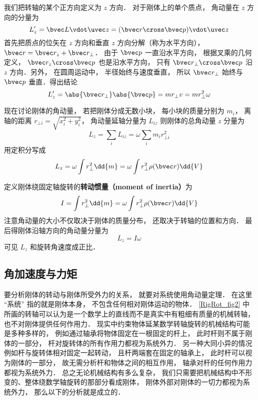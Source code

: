 我们把转轴的某个正方向定义为 $z$ 方向． 对于刚体上的单个质点， 角动量在 $z$ 方向的分量为
\begin{equation}
L'_{z} = \bvec L \vdot \uvec z = (\bvec r \cross \bvec p) \vdot \uvec z
\end{equation}
首先把质点的位矢在 $z$ 方向和垂直 $z$ 方向分解（称为水平方向）， $\bvec r = \bvec r_z + \bvec r_ \bot$． 由于 $\bvec p$ 一直沿水平方向， 根据叉乘的几何定义， $\bvec r_z \cross \bvec p$ 也是沿水平方向， 只有 $\bvec r_ \bot \cross \bvec p$ 沿 $z$ 方向．另外， 在圆周运动中， 半径始终与速度垂直， 所以 $\bvec r_ \bot$ 始终与 $\bvec p$ 垂直．得出结论
\begin{equation}
L'_z = \abs{\bvec r_\bot} \abs{\bvec p} = m r_ \bot v = mr_ \bot ^2\omega 
\end{equation}

现在讨论刚体的角动量， 若把刚体分成无数小块， 每小块的质量分别为 $m_i$， 离轴的距离 $r_{\bot i} = \sqrt{x_i^2 + y_i^2} $， 角动量延轴分量为 $L_{iz}$ 则刚体的总角动量 $z$ 分量为
\begin{equation}
L_z = \sum_i L_{iz} = \omega \sum_i m_i r_{ \bot i}^2
\end{equation}
用定积分写成
\begin{equation}
L_z = \omega \int r_ \bot ^2 \dd{m} = \omega \int r_ \bot ^2\rho(\bvec r)  \dd{V} 
\end{equation}

定义刚体绕固定轴旋转的\textbf{转动惯量（moment of inertia）}为
\begin{equation}
I = \int r_ \bot ^2 \dd{m} = \omega \int r_ \bot ^2\rho(\bvec r) \dd{V} 
\end{equation}
注意角动量的大小不仅取决于刚体的质量分布， 还取决于转轴的位置和方向． 最后得刚体沿轴方向的角动量分量为
\begin{equation}\label{RigRot_eq5}
L_z = I \omega 
\end{equation}
可见 $L_z$ 和旋转角速度成正比．

\subsection{角加速度与力矩}
要分析刚体的转动与刚体所受外力的关系， 就要对系统使用角动量定理． 在这里 “系统” 指的就是刚体本身， 不包含任何相对刚体运动的物体． \autoref{RigRot_fig2} 中所画的转轴可以认为是一个数学上的直线而不是真实中有粗细有质量的机械转轴， 也不对刚体提供任何作用力． 现实中约束物体延某数学转轴旋转的机械结构可能是多种多样的， 例如通过轴承将物体固定在一根固定的杆上， 此时杆则不属于刚体的一部分， 杆对旋转体的所有作用力都视为系统外力． 另一种大同小异的情况例如杆与旋转体相对固定一起转动， 且杆两端套在固定的轴承上， 此时杆可以视为刚体的一部分， 故无需分析杆和物体之间的相互作用， 轴承对杆的任何作用力都视为系统外力． 总之无论机械结构有多么复杂， 我们只需要把机械结构中不形变的、整体绕数学轴旋转的那部分看成刚体， 刚体外部对刚体的一切力都视为系统外力， 那么以下的分析就是成立的．

